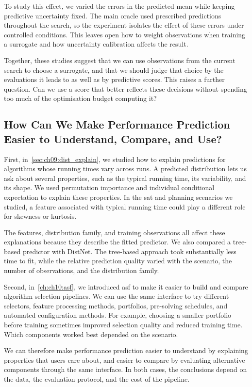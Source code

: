To study this effect, we varied the errors in the predicted mean while keeping predictive uncertainty fixed. The main oracle used prescribed predictions throughout the search, so the experiment isolates the effect of these errors under controlled conditions. This leaves open how to weight observations when training a surrogate and how uncertainty calibration affects the result.

Together, these studies suggest that we can use observations from the current search to choose a surrogate, and that we should judge that choice by the evaluations it leads to as well as by predictive scores. This raises a further question. Can we use a score that better reflects these decisions without spending too much of the optimisation budget computing it?

\subsection{How Can We Make Performance Prediction Easier to Understand, Compare, and Use?}

First, in~\cref{sec:ch09:dist_explain}, we studied how to explain predictions for algorithms whose running times vary across runs. A predicted distribution lets us ask about several properties, such as the typical running time, its variability, and its shape. We used permutation importance and individual conditional expectation to explain these properties. In the \gls{sat} and planning scenarios we studied, a feature associated with typical running time could play a different role for skewness or kurtosis.

The features, distribution family, and training observations all affect these explanations because they describe the fitted predictor. We also compared a tree-based predictor with DistNet. The tree-based approach took substantially less time to fit, while the relative prediction quality varied with the scenario, the number of observations, and the distribution family.

Second, in~\cref{ch:ch10:asf}, we introduced \gls{asf} to make it easier to build and compare algorithm selection pipelines. We can use the same interface to try different selectors, feature processing methods, portfolios, pre-solving schedules, and automated configuration methods. For example, choosing a smaller portfolio before training sometimes improved selection quality and reduced training time. Which components worked best depended on the scenario.

We can therefore make performance prediction easier to understand by explaining properties that users care about, and easier to compare by evaluating alternative components through the same interface. In both cases, the conclusions depend on the data, the evaluation protocol, and the cost of the pipeline.

